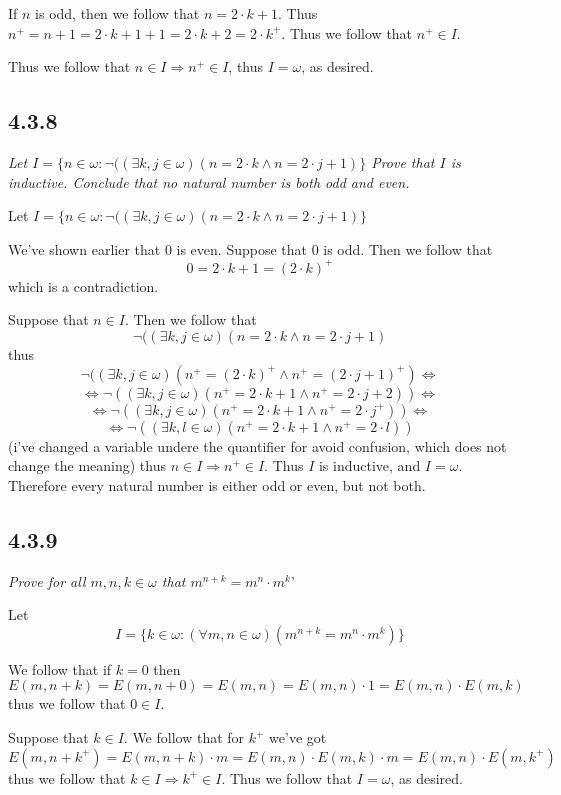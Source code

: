 \documentclass[11pt,oneside,titlepage]{book}
\DeclareMathOperator \lra {\Leftrightarrow}
\DeclareMathOperator \ra {\Rightarrow}
\begin{document}
If $n$ is odd, then we follow that $n = 2 \cdot k + 1$. Thus $n^+ = n + 1 = 2 \cdot k + 1 + 1 =
2 \cdot k + 2 = 2 \cdot k^+$. Thus we follow that $n^+ \in I$.

Thus we follow that $n \in I \ra n^+ \in I$, thus $I = \omega$, as desired.

\subsection*{4.3.8}

\textit{Let $I = \{n \in \omega: \neg((\exists k, j \in \omega)(n = 2 \cdot k \land
  n = 2 \cdot j + 1)\}$
  Prove that $I$ is inductive. Conclude that no natural number is both odd and even.}

Let
$I = \{n \in \omega: \neg((\exists k, j \in \omega)(n = 2 \cdot k \land n = 2 \cdot j + 1)\}$

We've shown earlier that $0$ is even. Suppose that $0$ is odd. Then we follow that
$$0 = 2 \cdot k + 1 = (2 \cdot k)^+$$
which is a contradiction.

Suppose that $n \in I$. Then we follow that
$$\neg((\exists k, j \in \omega)(n = 2 \cdot k \land n = 2 \cdot j + 1)$$
thus
$$\neg((\exists k, j \in \omega)(n^+ = (2 \cdot k)^+ \land n^+ = (2 \cdot j + 1)^+) \lra$$
$$\lra \neg((\exists k, j \in \omega)(n^+ = 2 \cdot k + 1 \land n^+ = 2 \cdot j + 2))\lra $$
$$\lra \neg((\exists k, j \in \omega)(n^+ = 2 \cdot k + 1 \land n^+ = 2 \cdot j^+))\lra$$
$$\lra \neg((\exists k, l \in \omega)(n^+ = 2 \cdot k + 1 \land n^+ = 2 \cdot l))$$
(i've changed a variable undere the quantifier for avoid confusion, which does not change the
meaning)
thus $n \in I \ra n^+ \in I$. Thus $I$ is inductive, and $I = \omega$. Therefore
every natural number is either odd or even, but not both.


\subsection*{4.3.9}

\textit{Prove for all $m, n, k \in \omega$ that $m^{n + k} = m^n \cdot m^k$}'

Let
$$I = \{k \in \omega: (\forall m, n \in \omega)(m^{n + k} = m^n \cdot m^k)\}$$

We follow that if $k = 0$ then
$$E(m, n + k) = E(m, n + 0) = E(m, n) = E(m, n) \cdot 1 = E(m, n) \cdot E(m, k)$$
thus we follow that $0 \in I$.

Suppose that $k \in I$. We follow that for $k^+$ we've got
$$E(m, n + k^+) = E(m, n + k) \cdot m = E(m, n) \cdot E(m, k) \cdot m =
E(m, n) \cdot E(m, k^+)$$
thus we follow that $k \in I \ra k^+ \in I$. Thus we follow that $I = \omega$, as desired.
\end{document}
